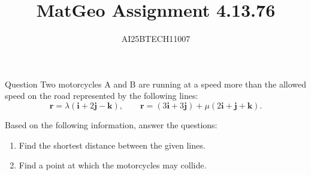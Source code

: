 \documentclass{beamer}
\title 
{MatGeo Assignment 4.13.76}
\author
{AI25BTECH11007}
\begin{document}
\frame{\titlepage}
\begin{frame}{Question}
    Two motorcycles A and B are running at a speed more than the allowed speed on
the road represented by the following lines:
\[
\mathbf{r} = \lambda(\mathbf{i} + 2\mathbf{j} - \mathbf{k}), \qquad
\mathbf{r} = (3\mathbf{i} + 3\mathbf{j}) + \mu(2\mathbf{i} + \mathbf{j} + \mathbf{k}).
\]

Based on the following information, answer the questions:

\begin{enumerate}
    \item Find the shortest distance between the given lines.
    \item Find a point at which the motorcycles may collide.
\end{enumerate}

\end{frame}
\end{document}
